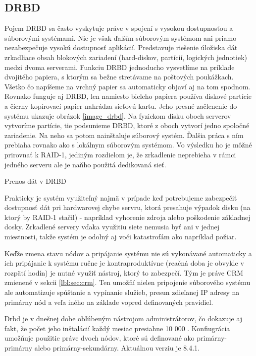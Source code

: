 \subsection{DRBD}
Pojem DRBD sa často vyskytuje práve v spojení s vysokou dostupnosťou a súborovými systémami. Nie je však ďalším súborovým systémom ani priamo nezabezpečuje vysokú dostupnosť aplikácií. Predstavuje riešenie úložiska dát zrkadliace obsah blokových zariadení (hard-diskov, partícií, logických jednotiek) medzi dvoma serverami. Funkciu DRBD jednoducho vysvetlíme na príklade dvojitého papiera, s ktorým sa bežne stretávame na poštových poukážkach. Všetko čo napíšeme na vrchný papier sa automaticky objaví aj na tom spodnom. Rovnako funguje aj DRBD, len namiesto bieleho papiera používa diskové partície a čierny kopírovací papier nahrádza sieťovú kartu. Jeho presné začlenenie do systému ukazuje obrázok \ref{image_drbd}. Na fyzickom disku oboch serverov vytvoríme partície, tie podsunieme DRBD, ktoré z oboch vytvorí jedno spoločné zariadenie. Na neho sa potom nainštaluje súborový systém. Ďalšia práca s ním prebiaha rovnako ako s lokálnym súborovým systémom. Vo výsledku ho je môžné prirovnať k RAID-1, jediným rozdielom je, že zrkadlenie neprebieha v rámci jedného serveru ale je naňho použitá dedikovaná sieť.

 {Prenos dát v DRBD}

Prakticky je systém využiteľný najmä v prípade keď potrebujeme zabezpečiť dostupnosť dát pri hardwarovej chybe servru, ktorá presahuje výpadok disku (na ktorý by RAID-1 stačil) - napríklad vyhorenie zdroja alebo poškodenie základnej dosky. Zrkadlené servery vďaka využitiu siete nemusia byť ani v jednej miestnosti, takže systém je odolný aj voči katastrofám ako napríklad požiar.

Keďže zmena stavu nódov a pripájanie systému nie sú vykonávané automaticky a ich pripájanie k systému ručne je kontraproduktívne (reačná doba je obvykle v rozpätí hodín) je nutné využiť nástroj, ktorý to zabezpečí. Tým je práve CRM zmienené v sekcii \ref{lbl:sec:crm}. Ten umožňí nielen pripojenie súborového systému ale automatizuje spúštanie a vypínanie služieb, presun zdieľanej IP adresy na primárny nód a veľa iného na základe vopred definovaných pravidiel.

Drbd je v dnešnej dobe obľúbeným nástrojom administrátorov, čo dokazuje aj fakt, že počet jeho inštalácií každý mesiac presiahne 10 000 \cite{web:drbd.org}. Konfiugrácia umožňuje použitie práve dvoch nódov, ktoré sú definované ako primárny-primárny alebo primárny-sekundárny. Aktuálnou verziu je 8.4.1.

